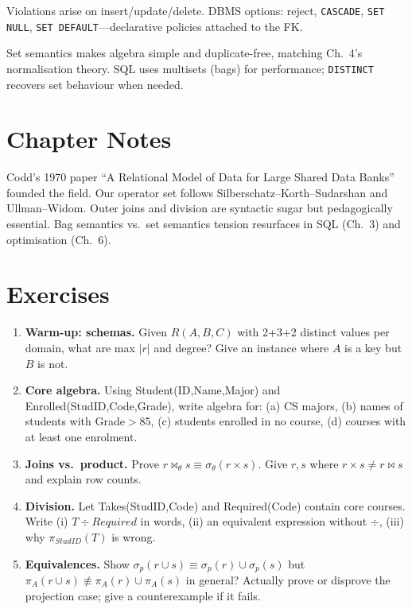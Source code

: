 Violations arise on insert/update/delete. DBMS options: reject, \texttt{CASCADE}, \texttt{SET NULL}, \texttt{SET DEFAULT}---declarative policies attached to the FK.

\begin{remark}
Set semantics makes algebra simple and duplicate-free, matching Ch.~4's normalisation theory. SQL uses multisets (bags) for performance; \texttt{DISTINCT} recovers set behaviour when needed.
\end{remark}

\section{Chapter Notes}

Codd's 1970 paper ``A Relational Model of Data for Large Shared Data Banks'' founded the field. Our operator set follows Silberschatz--Korth--Sudarshan and Ullman--Widom. Outer joins and division are syntactic sugar but pedagogically essential. Bag semantics vs.\ set semantics tension resurfaces in SQL (Ch.~3) and optimisation (Ch.~6).

\section{Exercises}
\label{sec:ch02-ex}
\begin{enumerate}[label=E2.\arabic*, leftmargin=*, itemsep=0.75em]
    \item \textbf{Warm-up: schemas.} Given $R(A,B,C)$ with 2+3+2 distinct values per domain, what are max $|r|$ and degree? Give an instance where $A$ is a key but $B$ is not.
    \item \textbf{Core algebra.} Using Student(ID,Name,Major) and Enrolled(StudID,Code,Grade), write algebra for: (a) CS majors, (b) names of students with Grade$>$85, (c) students enrolled in no course, (d) courses with at least one enrolment.
    \item \textbf{Joins vs.\ product.} Prove $r\bowtie_\theta s\equiv\sigma_\theta(r\times s)$. Give $r,s$ where $r\times s\neq r\bowtie s$ and explain row counts.
    \item \textbf{Division.} Let Takes(StudID,Code) and Required(Code) contain core courses. Write (i) $T\div Required$ in words, (ii) an equivalent expression without $\div$, (iii) why $\pi_{\mathit{StudID}}(T)$ is wrong.
    \item \textbf{Equivalences.} Show $\sigma_{p}(r\cup s)\equiv\sigma_p(r)\cup\sigma_p(s)$ but $\pi_A(r\cup s)\not\equiv\pi_A(r)\cup\pi_A(s)$ in general? Actually prove or disprove the projection case; give a counterexample if it fails.
\end{enumerate}
